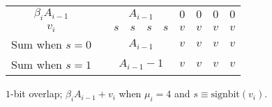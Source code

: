 \documentclass[10pt]{article}
\theoremstyle{definition}
\theoremstyle{remark}
\numberwithin{equation}{section}
\begin{document}
\begin{figure}[t]
	\centering
	\begin{tabular}{crcccc|llll}
		\cmidrule{3-10}    $\beta_i A_{i-1}$ &       & \multicolumn{4}{c|}{$A_{i-1}$} & $0$     & $0$     & $0$     & \multicolumn{1}{c|}{$0$}  \\
		\cmidrule{3-10}    $v_i$ &       &
		\multicolumn{1}{c}{$s$} & \multicolumn{1}{c}{$s$} &  \multicolumn{1}{c|}{$s$} & \multicolumn{1}{c}{$s$} & $v$     & $v$     & $v$     & \multicolumn{1}{c|}{$v$} \\ 
		\cmidrule{3-10}    Sum when $s = 0$ &       & \multicolumn{4}{c|}{$A_{i-1}$} & $v$     & $v$     & $v$     & \multicolumn{1}{c|}{$v$} \\
		\cmidrule{3-10}   Sum when $s = 1$ &       & \multicolumn{4}{c|}{$A_{i-1} - 1$} & $v$     & $v$     & $v$     & \multicolumn{1}{c|}{$v$} \\
		\cmidrule{3-10}    
	\end{tabular}%
	\caption{$1$-bit overlap; $\beta_i A_{i-1} + v_i$ when $\mu_i = 4$ and $s \equiv \text{signbit}(v_i)$.\label{fig:overlap_1b}}
\end{figure}
\end{document}
